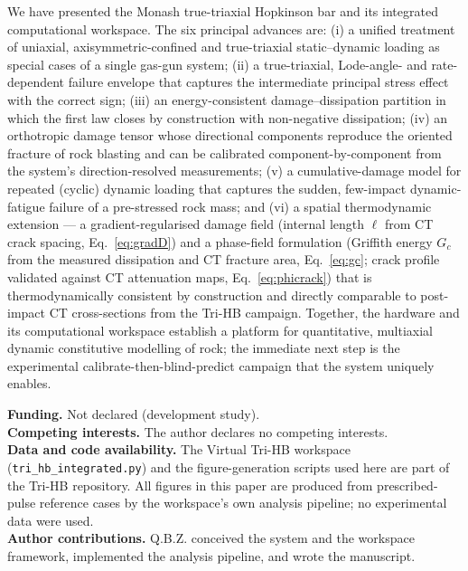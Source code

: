 \documentclass[sn-basic]{sn-jnl}
\begin{document}
We have presented the Monash true-triaxial Hopkinson bar and its integrated
computational workspace. The six principal advances are: (i) a unified treatment of
uniaxial, axisymmetric-confined and true-triaxial static--dynamic loading as
special cases of a single gas-gun system; (ii) a true-triaxial, Lode-angle- and rate-dependent failure
envelope that captures the intermediate principal stress effect with the correct
sign; (iii) an energy-consistent damage--dissipation partition in which the first
law closes by construction with non-negative dissipation; (iv) an orthotropic damage tensor whose
directional components reproduce the oriented fracture of rock blasting and can be
calibrated component-by-component from the system's direction-resolved
measurements; (v) a cumulative-damage model for repeated (cyclic) dynamic
loading that captures the sudden, few-impact dynamic-fatigue failure of a
pre-stressed rock mass; and (vi) a spatial thermodynamic extension --- a
gradient-regularised damage field (internal length $\ell$ from CT crack spacing,
Eq.~\eqref{eq:gradD}) and a phase-field formulation (Griffith energy $G_c$ from
the measured dissipation and CT fracture area, Eq.~\eqref{eq:gc}; crack profile
validated against CT attenuation maps, Eq.~\eqref{eq:phicrack}) that is
thermodynamically consistent by construction and directly comparable to
post-impact CT cross-sections from the Tri-HB campaign.  Together, the hardware
and its computational workspace establish a platform for quantitative, multiaxial
dynamic constitutive modelling of rock; the immediate next step is the experimental
calibrate-then-blind-predict campaign that the system uniquely enables.

\backmatter

\noindent\textbf{Funding.} Not declared (development study).\\[2pt]
\textbf{Competing interests.} The author declares no competing interests.\\[2pt]
\textbf{Data and code availability.} The Virtual Tri-HB workspace
(\texttt{tri\_hb\_integrated.py}) and the figure-generation scripts used here are
part of the Tri-HB repository. All figures in this paper are produced from
prescribed-pulse reference cases by the workspace's own analysis pipeline; no
experimental data were used.\\[2pt]
\textbf{Author contributions.} Q.B.Z. conceived the system and the workspace
framework, implemented the analysis pipeline, and wrote the manuscript.


\end{document}
